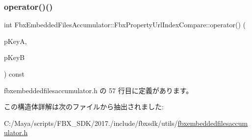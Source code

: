 \subsubsection{\texorpdfstring{operator()()}{operator()()}}
{\footnotesize\ttfamily int Fbx\+Embedded\+Files\+Accumulator\+::\+Fbx\+Property\+Url\+Index\+Compare\+::operator() (\begin{DoxyParamCaption}\item[{const \hyperlink{struct_fbx_embedded_files_accumulator_1_1_property_url_index}{Property\+Url\+Index} \&}]{p\+KeyA,  }\item[{const \hyperlink{struct_fbx_embedded_files_accumulator_1_1_property_url_index}{Property\+Url\+Index} \&}]{p\+KeyB }\end{DoxyParamCaption}) const\hspace{0.3cm}{\ttfamily [inline]}}



 fbxembeddedfilesaccumulator.\+h の 57 行目に定義があります。



この構造体詳解は次のファイルから抽出されました\+:\begin{DoxyCompactItemize}
\item 
C\+:/\+Maya/scripts/\+F\+B\+X\+\_\+\+S\+D\+K/2017./include/fbxsdk/utils/\hyperlink{fbxembeddedfilesaccumulator_8h}{fbxembeddedfilesaccumulator.\+h}\end{DoxyCompactItemize}
